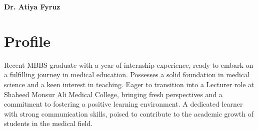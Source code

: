 \documentclass[a4paper,12pt]{article}
\begin{document}
\begin{minipage}[t]{\textwidth}
    \raggedright
    {\Huge\bfseries\color{black}Dr. Atiya Fyruz}
    \vspace{1.5cm}    
\end{minipage}
\begin{minipage}[t][6.4cm]{\textwidth}
\section*{Profile}
  Recent MBBS graduate with a year of internship experience, ready to embark on a fulfilling journey in medical education. 
  Possesses a solid foundation in medical science and a keen interest in teaching. 
  Eager to transition into a Lecturer role at Shaheed Monsur Ali Medical College, bringing fresh perspectives and a commitment to fostering a positive learning environment. 
  A dedicated learner with strong communication skills, poised to contribute to the academic growth of students in the medical field.
\end{minipage}
\end{document}
